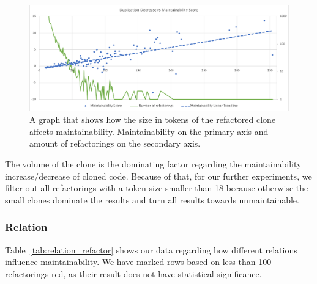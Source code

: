 \documentclass[sigconf,review, table]{acmart}
\begin{document}
\begin{figure}
  \includegraphics[width=1\textwidth]{img/duplication}
  \caption{A graph that shows how the size in tokens of the refactored clone affects maintainability. Maintainability on the primary axis and amount of refactorings on the secondary axis.}
  \label{fig:duplication}
\end{figure}

The volume of the clone is the dominating factor regarding the maintainability increase/decrease of cloned code. Because of that, for our further experiments, we filter out all refactorings with a token size smaller than 18 because otherwise the small clones dominate the results and turn all results towards unmaintainable.

\subsubsection{Relation}
Table~\ref{tab:relation_refactor} shows our data regarding how different relations influence maintainability. We have marked rows based on less than 100 refactorings red, as their result does not have statistical significance.
\end{document}
